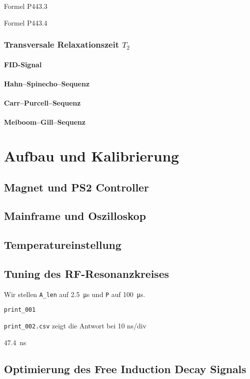 Formel P443.3

Formel P443.4

\subsection{Transversale Relaxationszeit $T_2$}
\subsubsection{FID-Signal}
\subsubsection{Hahn–Spinecho–Sequenz}
\subsubsection{Carr–Purcell–Sequenz}
\subsubsection{Meiboom–Gill–Sequenz}

\chapter{Aufbau und Kalibrierung}
\section{Magnet und PS2 Controller}
\section{Mainframe und Oszilloskop}

\section{Temperatureinstellung}
\section{Tuning des RF-Resonanzkreises}

Wir stellen \texttt{A\_len} auf \SI{2.5}{\micro\second} und \texttt P auf
\SI{100}{\micro\second}.

\texttt{print\_001}

\texttt{print\_002.csv} zeigt die Antwort bei 10 ns/div

\SI{47.4}{\nano\second}

\section{Optimierung des Free Induction Decay Signals}

